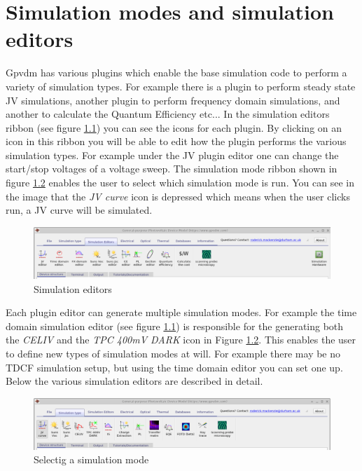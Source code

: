 \chapter{Simulation modes and simulation editors}
\label{sec:simmodes}

Gpvdm has various plugins which enable the base simulation code to perform a variety of simulation types. For example there is a plugin to perform steady state JV simulations, another plugin to perform frequency domain simulations, and another to calculate the Quantum Efficiency etc... In the simulation editors ribbon (see figure \ref{fig:simeditors}) you can see the icons for each plugin. By clicking on an icon in this ribbon you will be able to edit how the plugin performs the various simulation types.  For example under the JV plugin editor one can change the start/stop voltages of a voltage sweep.  The simulation mode ribbon shown in figure \ref{fig:simmodes} enables the user to select which simulation mode is run.  You can see in the image that the \emph{JV curve} icon is depressed which means when the user clicks run, a JV curve will be simulated.

\begin{figure}[H]
\centering
\includegraphics[width=1.0\textwidth]{./images/ribbon_sim_editors.png}
\caption{Simulation editors}
\label{fig:simeditors}
\end{figure}

Each plugin editor can generate multiple simulation modes.  For example the time domain simulation editor (see figure \ref{fig:simeditors}) is responsible for the generating both the \emph{CELIV} and the \emph{TPC 400mV DARK} icon in Figure \ref{fig:simmodes}. This enables the user to define new types of simulation modes at will.  For example there may be no TDCF simulation setup, but using the time domain editor you can set one up.  Below the various simulation editors are described in detail.

\begin{figure}[H]
\centering
\includegraphics[width=1.0\textwidth]{./images/ribbon_sim_modes.png}
\caption{Selectig a simulation mode}
\label{fig:simmodes}
\end{figure}

